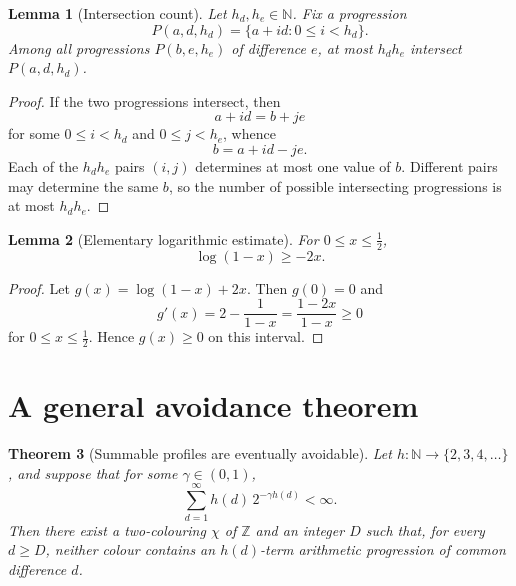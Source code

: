 \documentclass[11pt]{article}
\newtheorem{theorem}{Theorem}[section]
\newtheorem{lemma}[theorem]{Lemma}
\theoremstyle{definition}
\theoremstyle{remark}
\newcommand{\N}{\mathbb N}
\newcommand{\Z}{\mathbb Z}
\newcommand{\col}{\chi}
\begin{document}
\begin{lemma}[Intersection count]\label{lem:intersection-count}
Let $h_d,h_e\in\N$. Fix a progression
\[
P(a,d,h_d)=\{a+id:0\le i<h_d\}.
\]
Among all progressions $P(b,e,h_e)$ of difference $e$, at most $h_dh_e$ intersect $P(a,d,h_d)$.
\end{lemma}

\begin{proof}
If the two progressions intersect, then
\[
a+id=b+je
\]
for some $0\le i<h_d$ and $0\le j<h_e$, whence
\[
b=a+id-je.
\]
Each of the $h_dh_e$ pairs $(i,j)$ determines at most one value of $b$. Different pairs may determine the same $b$, so the number of possible intersecting progressions is at most $h_dh_e$.
\end{proof}

\begin{lemma}[Elementary logarithmic estimate]\label{lem:log-estimate}
For $0\le x\le\tfrac12$,
\[
\log(1-x)\ge-2x.
\]
\end{lemma}

\begin{proof}
Let $g(x)=\log(1-x)+2x$. Then $g(0)=0$ and
\[
g'(x)=2-\frac1{1-x}=\frac{1-2x}{1-x}\ge0
\]
for $0\le x\le\tfrac12$. Hence $g(x)\ge0$ on this interval.
\end{proof}

\section{A general avoidance theorem}

\begin{theorem}[Summable profiles are eventually avoidable]\label{thm:summable-avoidance}
Let $h\colon\N\to\{2,3,4,\ldots\}$, and suppose that for some $\gamma\in(0,1)$,
\begin{equation}\label{eq:summability}
\sum_{d=1}^{\infty}h(d)\,2^{-\gamma h(d)}<\infty.
\end{equation}
Then there exist a two-colouring $\col$ of $\Z$ and an integer $D$ such that, for every $d\ge D$, neither colour contains an $h(d)$-term arithmetic progression of common difference $d$.
\end{theorem}
\end{document}
